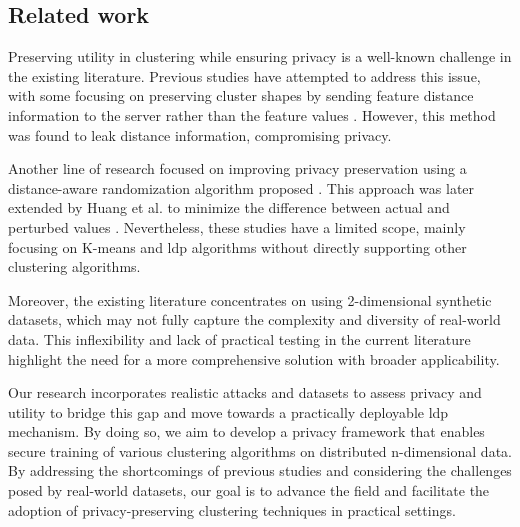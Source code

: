\newpage

\subsection*{Related work}
Preserving utility in clustering while ensuring privacy is a well-known challenge in the existing literature.
Previous studies have attempted to address this issue, with some focusing on preserving cluster shapes by sending feature distance information to the server rather than the feature values \citep{sun_distributed_2019}.
However, this method was found to leak distance information, compromising privacy.

Another line of research focused on improving privacy preservation using a distance-aware randomization algorithm proposed \citep{xia_distributed_2020}.
This approach was later extended by Huang et al. to minimize the difference between actual and perturbed values \citep{9679364}.
Nevertheless, these studies have a limited scope, mainly focusing on K-means and \gls{ldp} algorithms without directly supporting other clustering algorithms.

Moreover, the existing literature concentrates on using 2-dimensional synthetic datasets, which may not fully capture the complexity and diversity of real-world data.
This inflexibility and lack of practical testing in the current literature highlight the need for a more comprehensive solution with broader applicability.

Our research incorporates realistic attacks and datasets to assess privacy and utility to bridge this gap and move towards a practically deployable \gls{ldp} mechanism.
By doing so, we aim to develop a privacy framework that enables secure training of various clustering algorithms on distributed n-dimensional data.
By addressing the shortcomings of previous studies and considering the challenges posed by real-world datasets, our goal is to advance the field and facilitate the adoption of privacy-preserving clustering techniques in practical settings.

